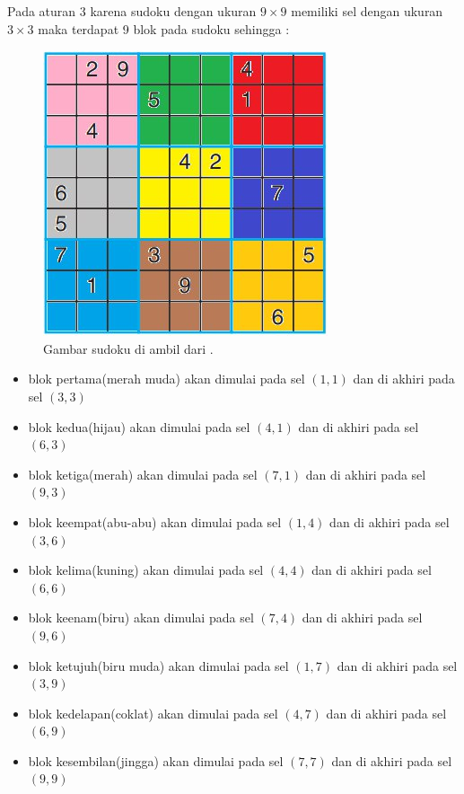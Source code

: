 Pada aturan 3 karena sudoku dengan ukuran $9\times9$ memiliki sel dengan ukuran $3\times3$ maka terdapat 9 blok pada sudoku sehingga :

\begin{figure}[H]
\begin{centering}
	\includegraphics[scale=0.7]{gambar/9x9color.jpeg}
	
	\caption{Gambar sudoku di ambil dari \cite{rosen1995discrete}.}
\end{centering}
\end{figure}

\begin{itemize}
	\item blok pertama(merah muda) akan dimulai pada sel $\left(1,1\right)$ dan di akhiri
	pada sel $\left(3,3\right)$
	\item blok kedua(hijau) akan dimulai pada sel $\left(4,1\right)$ dan di akhiri
	pada sel $\left(6,3\right)$
	\item blok ketiga(merah) akan dimulai pada sel $\left(7,1\right)$ dan di akhiri
	pada sel $\left(9,3\right)$
	\item blok keempat(abu-abu) akan dimulai pada sel $\left(1,4\right)$ dan di akhiri
	pada sel $\left(3,6\right)$
	\item blok kelima(kuning) akan dimulai pada sel $\left(4,4\right)$ dan di akhiri
	pada sel $\left(6,6\right)$
	\item blok keenam(biru) akan dimulai pada sel $\left(7,4\right)$ dan di akhiri
	pada sel $\left(9,6\right)$
	\item blok ketujuh(biru muda) akan dimulai pada sel $\left(1,7\right)$ dan di akhiri
	pada sel $\left(3,9\right)$
	\item blok kedelapan(coklat) akan dimulai pada sel $\left(4,7\right)$ dan di akhiri
	pada sel $\left(6,9\right)$
	\item blok kesembilan(jingga) akan dimulai pada sel $\left(7,7\right)$ dan di akhiri
	pada sel $\left(9,9\right)$
\end{itemize}


